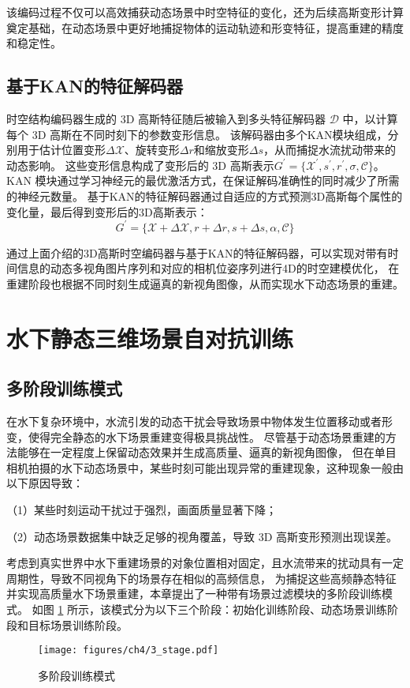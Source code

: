 该编码过程不仅可以高效捕获动态场景中时空特征的变化，还为后续高斯变形计算奠定基础，在动态场景中更好地捕捉物体的运动轨迹和形变特征，提高重建的精度和稳定性。

\subsection{基于KAN的特征解码器}
时空结构编码器生成的 3D 高斯特征随后被输入到多头特征解码器 $\mathcal{D}$ 中，以计算每个 3D 高斯在不同时刻下的参数变形信息。
该解码器由多个KAN模块组成，分别用于估计位置变形$\Delta \mathcal{X}$、旋转变形$\Delta r$和缩放变形$\Delta s$，从而捕捉水流扰动带来的动态影响。
这些变形信息构成了变形后的 3D 高斯表示$G^\prime=\{\mathcal{X}^\prime, s^\prime, r^\prime, \sigma, \mathcal{C} \}$。
KAN 模块通过学习神经元的最优激活方式，在保证解码准确性的同时减少了所需的神经元数量。
基于KAN的特征解码器通过自适应的方式预测3D高斯每个属性的变化量，最后得到变形后的3D高斯表示：
\begin{equation}
    G^\prime = \{ \mathcal{X} + \Delta \mathcal{X}, r + \Delta r, s + \Delta s, \alpha,\mathcal{C} \}
\end{equation}

通过上面介绍的3D高斯时空编码器与基于KAN的特征解码器，可以实现对带有时间信息的动态多视角图片序列和对应的相机位姿序列进行4D的时空建模优化，
在重建阶段也根据不同时刻生成逼真的新视角图像，从而实现水下动态场景的重建。

\section{水下静态三维场景自对抗训练}
\subsection{多阶段训练模式}
在水下复杂环境中，水流引发的动态干扰会导致场景中物体发生位置移动或者形变，使得完全静态的水下场景重建变得极具挑战性。
尽管基于动态场景重建的方法能够在一定程度上保留动态效果并生成高质量、逼真的新视角图像，
但在单目相机拍摄的水下动态场景中，某些时刻可能出现异常的重建现象，这种现象一般由以下原因导致：

（1）某些时刻运动干扰过于强烈，画面质量显著下降；

（2）动态场景数据集中缺乏足够的视角覆盖，导致 3D 高斯变形预测出现误差。

考虑到真实世界中水下重建场景的对象位置相对固定，且水流带来的扰动具有一定周期性，导致不同视角下的场景存在相似的高频信息，
为捕捉这些高频静态特征并实现高质量水下场景重建，本章提出了一种带有场景过滤模块的多阶段训练模式。
如图 \ref{img:3_stage} 所示，该模式分为以下三个阶段：初始化训练阶段、动态场景训练阶段和目标场景训练阶段。
\begin{figure}[htbp]
    \centering
    \texttt{[image: figures/ch4/3\_stage.pdf]}
    \caption{多阶段训练模式}
    \label{img:3_stage}
\end{figure}

